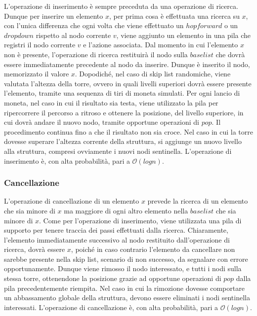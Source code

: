 			L'operazione di inserimento è sempre preceduta da una operazione di ricerca. Dunque per inserire un elemento $ x $, per prima cosa è effettuata una ricerca su $ x $, con l'unica differenza che ogni volta che viene effettuato un $ hop forward $ o un $ drop down $ rispetto al nodo corrente $ v $, viene aggiunto un elemento in una pila che registri il nodo corrente $ v $ e l'azione associata.
			Dal momento in cui l'elemento $ x $ non è presente, l'operazione di ricerca restituirà il nodo sulla $base list$ che dovrà essere immediatamente precedente al nodo da inserire. Dunque è inserito il nodo, memorizzato il valore $ x $. Dopodiché, nel caso di skip list randomiche, viene valutata l'altezza della torre, ovvero in quali livelli superiori dovrà essere presente l'elemento, tramite una sequenza di tiri di moneta simulati. Per ogni lancio di moneta, nel caso in cui il risultato sia testa, viene utilizzato la pila per ripercorrere il percorso a ritroso e ottenere la posizione, del livello superiore, in cui dovrà andare il nuovo nodo, tramite opportune operazioni di $ pop $. Il procedimento continua fino a che il risultato non sia croce. Nel caso in cui la torre dovesse superare l'altezza corrente della struttura, si aggiunge un nuovo livello alla struttura, compresi ovviamente i nuovi nodi sentinella.
			L'operazione di inserimento è, con alta probabilità, pari a $\mathcal{O}(log{}n)$.
		
		\subsubsection{Cancellazione}
		
			L'operazione di cancellazione di un elemento $ x $ prevede la ricerca di un elemento che sia minore di $ x $ ma maggiore di ogni altro elemento nella $base list$ che sia minore di $ x $. Come per l'operazione di inserimento, viene utilizzata una pila di supporto per tenere traccia dei passi effettuati dalla ricerca. Chiaramente, l'elemento immediatamente successivo al nodo restituito dall'operazione di ricerca, dovrà essere $ x $, poiché in caso contrario l'elemento da cancellare non sarebbe presente nella skip list, scenario di non successo, da segnalare con errore opportunamente.
			Dunque viene rimosso il nodo interessato, e tutti i nodi sulla stessa torre, ottenendone la posizione grazie ad opportune operazioni di $ pop $ dalla pila precedentemente riempita.
			Nel caso in cui la rimozione dovesse comportare un abbassamento globale della struttura, devono essere eliminati i nodi sentinella interessati.
			L'operazione di cancellazione è, con alta probabilità, pari a $\mathcal{O}(log{}n)$.
			
